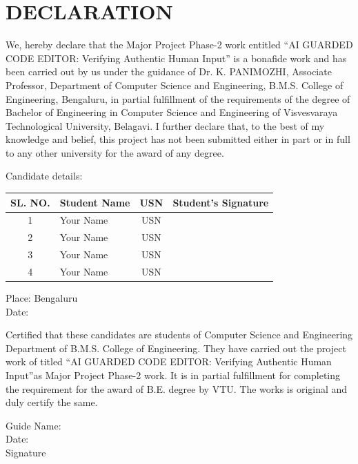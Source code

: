 \documentclass[12pt,a4paper]{report}
\begin{document}
\chapter*{DECLARATION}
\thispagestyle{empty}
We, hereby declare that the Major Project Phase-2 work entitled “AI GUARDED CODE  EDITOR: Verifying Authentic Human Input” is a bonafide work and has been carried out  by us under the guidance of Dr. K. PANIMOZHI, Associate Professor, Department of  Computer Science and Engineering, B.M.S. College of Engineering, Bengaluru, in partial  fulfillment of the requirements of the degree of Bachelor of Engineering in Computer Science  and Engineering of Visvesvaraya Technological University, Belagavi. 
I further declare that, to the best of my knowledge and belief, this project has not been  submitted either in part or in full to any other university for the award of any degree. 
\vspace{0.3cm}
\begin{flushleft}
Candidate details: 
\end{flushleft}
\vspace{0.1cm}
\begin{center}
\begin{tabular}{|c|l|c|c|}
\hline
\textbf{SL. NO.} & \textbf{Student Name} & \textbf{USN} & \textbf{Student’s Signature} \\
\hline
1 & Your Name & USN & \\
\hline
2 & Your Name & USN & \\
\hline
3 & Your Name  & USN & \\
\hline
4 & Your Name & USN & \\
\hline
\end{tabular}
\end{center}
\begin{flushleft}
Place: Bengaluru \\
Date: \\
\end{flushleft}
Certified that these candidates are students of Computer Science and Engineering Department  of B.M.S. College of Engineering. They have carried out the project work of titled “AI  GUARDED CODE EDITOR: Verifying Authentic Human Input”as Major Project Phase-2  work. It is in partial fulfillment for completing the requirement for the award of B.E. degree  by VTU. The works is original and duly certify the same.  
\vspace{1cm}
\begin{flushleft}
Guide Name: \\
Date: \\
Signature \\ 
\end{flushleft}
\end{document}
